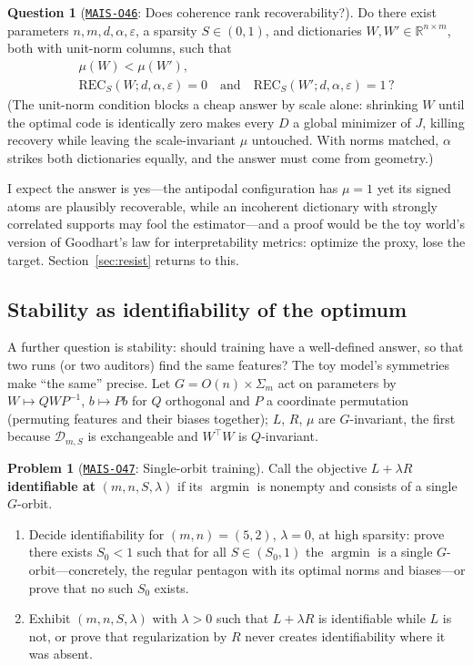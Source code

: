 \documentclass[11pt]{amsart}
\newcommand{\Oid}[1]{\href{https://github.com/lionellevine/MAIS/blob/main/open-problems/MAIS-O#1.md}{\texttt{MAIS-O#1}}}
\theoremstyle{plain}
\theoremstyle{definition}
\newtheorem{problem}[theorem]{Problem}
\newtheorem{question}[theorem]{Question}
\newcommand{\R}{\mathbb{R}}
\begin{document}
\begin{question}[\Oid{46}: Does coherence rank recoverability?]\label{q:goodhart}
Do there exist parameters $n,m,d,\alpha,\varepsilon$, a sparsity $S\in(0,1)$, and dictionaries $W,W'\in\R^{n\times m}$, both with unit-norm columns, such that
\[
\begin{gathered}
\mu(W)<\mu(W'),\\
\mathrm{REC}_S(W;d,\alpha,\varepsilon)=0
\quad\text{and}\quad
\mathrm{REC}_S(W';d,\alpha,\varepsilon)=1\,?
\end{gathered}
\]
(The unit-norm condition blocks a cheap answer by scale alone: shrinking $W$ until the optimal code is identically zero makes every $D$ a global minimizer of $J$, killing recovery while leaving the scale-invariant $\mu$ untouched. With norms matched, $\alpha$ strikes both dictionaries equally, and the answer must come from geometry.)
\end{question}

I expect the answer is yes---the antipodal configuration has $\mu=1$ yet its signed atoms are plausibly recoverable, while an incoherent dictionary with strongly correlated supports may fool the estimator---and a proof would be the toy world's version of Goodhart's law for interpretability metrics: optimize the proxy, lose the target. Section~\ref{sec:resist} returns to this.

\subsection{Stability as identifiability of the optimum}

A further question is stability: should training have a well-defined answer, so that two runs (or two auditors) find the same features? The toy model's symmetries make ``the same'' precise. Let $G = O(n)\times \Sigma_m$ act on parameters by $W\mapsto QW P^{-1}$, $b \mapsto Pb$ for $Q$ orthogonal and $P$ a coordinate permutation (permuting features and their biases together); $L$, $R$, $\mu$ are $G$-invariant, the first because $\mathcal D_{m,S}$ is exchangeable and $W^\top W$ is $Q$-invariant.

\begin{problem}[\Oid{47}: Single-orbit training]\label{prob:orbit}
Call the objective $L+\lambda R$ \textbf{identifiable at} $(m,n,S,\lambda)$ if its $\operatorname{argmin}$ is nonempty and consists of a single $G$-orbit.
\begin{enumerate}
\item Decide identifiability for $(m,n)=(5,2)$, $\lambda=0$, at high sparsity: prove there exists $S_0<1$ such that for all $S\in(S_0,1)$ the $\operatorname{argmin}$ is a single $G$-orbit---concretely, the regular pentagon with its optimal norms and biases---or prove that no such $S_0$ exists.
\item Exhibit $(m,n,S,\lambda)$ with $\lambda>0$ such that $L+\lambda R$ is identifiable while $L$ is not, or prove that regularization by $R$ never creates identifiability where it was absent.
\end{enumerate}
\end{problem}
\end{document}
